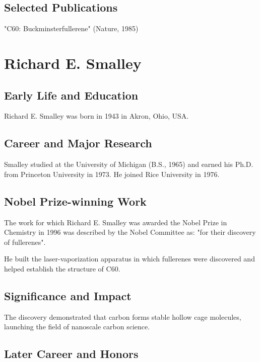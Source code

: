 \subsection*{Selected Publications}

"C60: Buckminsterfullerene" (Nature, 1985)

\clearpage

\section{Richard E. Smalley}

\subsection*{Early Life and Education}

Richard E. Smalley was born in 1943 in Akron, Ohio, USA.

\subsection*{Career and Major Research}

Smalley studied at the University of Michigan (B.S., 1965) and earned his Ph.D. from Princeton University in 1973. He joined Rice University in 1976.

\subsection*{Nobel Prize-winning Work}

The work for which Richard E. Smalley was awarded the Nobel Prize in Chemistry in 1996 was described by the Nobel Committee as: "for their discovery of fullerenes".

He built the laser-vaporization apparatus in which fullerenes were discovered and helped establish the structure of C60.

\subsection*{Significance and Impact}

The discovery demonstrated that carbon forms stable hollow cage molecules, launching the field of nanoscale carbon science.

\subsection*{Later Career and Honors}

